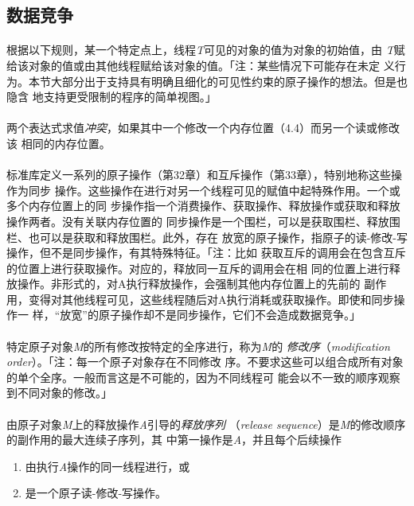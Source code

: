 \subsection{数据竞争}
\paragraph{}
根据以下规则，某一个特定点上，线程\textit{T}可见的对象的值为对象的初始值，由
\textit{T}赋给该对象的值或由其他线程赋给该对象的值。「注：某些情况下可能存在未定
义行为。本节大部分出于支持具有明确且细化的可见性约束的原子操作的想法。但是也隐含
地支持更受限制的程序的简单视图。」

\paragraph{}
两个表达式求值\textit{冲突}，如果其中一个修改一个内存位置（4.4）而另一个读或修改该
相同的内存位置。

\paragraph{}
标准库定义一系列的原子操作（第32章）和互斥操作（第33章），特别地称这些操作为同步
操作。这些操作在进行对另一个线程可见的赋值中起特殊作用。一个或多个内存位置上的同
步操作指一个消费操作、获取操作、释放操作或获取和释放操作两者。没有关联内存位置的
同步操作是一个围栏，可以是获取围栏、释放围栏、也可以是获取和释放围栏。此外，存在
放宽的原子操作，指原子的读-修改-写操作，但不是同步操作，有其特殊特征。「注：比如
获取互斥的调用会在包含互斥的位置上进行获取操作。对应的，释放同一互斥的调用会在相
同的位置上进行释放操作。非形式的，对A执行释放操作，会强制其他内存位置上的先前的
副作用，变得对其他线程可见，这些线程随后对A执行消耗或获取操作。即使和同步操作一
样，``放宽''的原子操作却不是同步操作，它们不会造成数据竞争。」

\paragraph{}
特定原子对象\textit{M}的所有修改按特定的全序进行，称为\textit{M}的
\textit{修改序}（\textit{modification order}）。「注：每一个原子对象存在不同修改
序。不要求这些可以组合成所有对象的单个全序。一般而言这是不可能的，因为不同线程可
能会以不一致的顺序观察到不同对象的修改。」

\paragraph{}
由原子对象\textit{M}上的释放操作\textit{A}引导的\textit{释放序列}
（\textit{release  sequence}）是\textit{M}的修改顺序的副作用的最大连续子序列，其
中第一操作是\textit{A}，并且每个后续操作
\begin{enumerate}
  \item{由执行\textit{A}操作的同一线程进行，或}
  \item{是一个原子读-修改-写操作。}
\end{enumerate}

